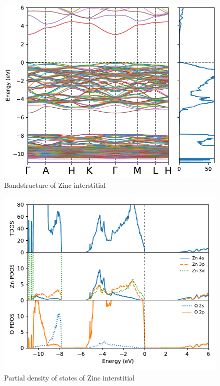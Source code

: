\begin{figure}[tbh!]
	\centering
	\includegraphics[width=0.6\linewidth]{"images/rnd/band-dos_Zn_i"}
	\caption[Bandstructure of Zinc interstitial]{Bandstructure of Zinc interstitial}
\end{figure}

\begin{figure}[tbh!]
	\centering
	\includegraphics[width=0.6\linewidth]{"images/rnd/dos-pdos_Zn_i"}
	\caption[Partial density of states of Zinc interstitial]{Partial density of states of Zinc interstitial}
\end{figure}


